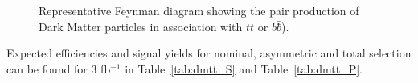 \begin{figure}[h!]
  \centering
  \caption{Representative Feynman diagram showing the pair production of Dark Matter particles in association with $t\bar{t}$ or $b\bar{b}$̄). \cite{Abercrombie:2015wmb}}
  \label{fig:feynman_hf}
\end{figure}


Expected efficiencies and signal yields for nominal, asymmetric and total selection can be found for 3 fb$^{-1}$ in Table~\ref{tab:dmtt_S} and Table~\ref{tab:dmtt_P}.

